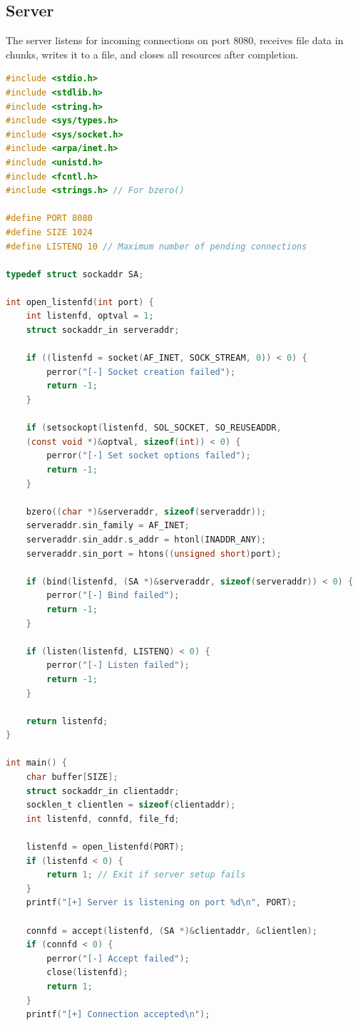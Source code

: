 \documentclass{article}
\begin{document}
\subsection{Server}

The server listens for incoming connections on port 8080, receives file data in chunks, writes it to a file, and closes all resources after completion.
\begin{lstlisting}[language=C, caption=Sever C Code, label=lst:code]
#include <stdio.h>
#include <stdlib.h>
#include <string.h>
#include <sys/types.h>
#include <sys/socket.h>
#include <arpa/inet.h>
#include <unistd.h>
#include <fcntl.h>
#include <strings.h> // For bzero()

#define PORT 8080
#define SIZE 1024
#define LISTENQ 10 // Maximum number of pending connections

typedef struct sockaddr SA;

int open_listenfd(int port) {
    int listenfd, optval = 1;
    struct sockaddr_in serveraddr;

    if ((listenfd = socket(AF_INET, SOCK_STREAM, 0)) < 0) {
        perror("[-] Socket creation failed");
        return -1;
    }

    if (setsockopt(listenfd, SOL_SOCKET, SO_REUSEADDR, 
    (const void *)&optval, sizeof(int)) < 0) {
        perror("[-] Set socket options failed");
        return -1;
    }

    bzero((char *)&serveraddr, sizeof(serveraddr));
    serveraddr.sin_family = AF_INET;
    serveraddr.sin_addr.s_addr = htonl(INADDR_ANY);
    serveraddr.sin_port = htons((unsigned short)port);

    if (bind(listenfd, (SA *)&serveraddr, sizeof(serveraddr)) < 0) {
        perror("[-] Bind failed");
        return -1;
    }

    if (listen(listenfd, LISTENQ) < 0) {
        perror("[-] Listen failed");
        return -1;
    }

    return listenfd;
}

int main() {
    char buffer[SIZE];
    struct sockaddr_in clientaddr;
    socklen_t clientlen = sizeof(clientaddr);
    int listenfd, connfd, file_fd;

    listenfd = open_listenfd(PORT);
    if (listenfd < 0) {
        return 1; // Exit if server setup fails
    }
    printf("[+] Server is listening on port %d\n", PORT);

    connfd = accept(listenfd, (SA *)&clientaddr, &clientlen);
    if (connfd < 0) {
        perror("[-] Accept failed");
        close(listenfd);
        return 1;
    }
    printf("[+] Connection accepted\n");


\end{lstlisting}
\end{document}
